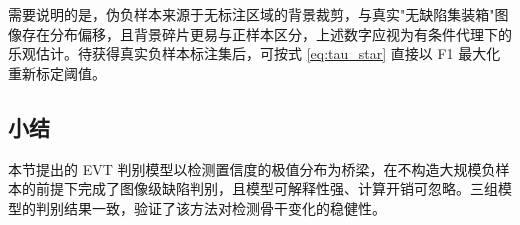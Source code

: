需要说明的是，伪负样本来源于无标注区域的背景裁剪，与真实"无缺陷集装箱"图像存在分布偏移，且背景碎片更易与正样本区分，上述数字应视为有条件代理下的乐观估计。待获得真实负样本标注集后，可按式 \eqref{eq:tau_star} 直接以 F1 最大化重新标定阈值。

\subsection{小结}

本节提出的 EVT 判别模型以检测置信度的极值分布为桥梁，在不构造大规模负样本的前提下完成了图像级缺陷判别，且模型可解释性强、计算开销可忽略。三组模型的判别结果一致，验证了该方法对检测骨干变化的稳健性。
